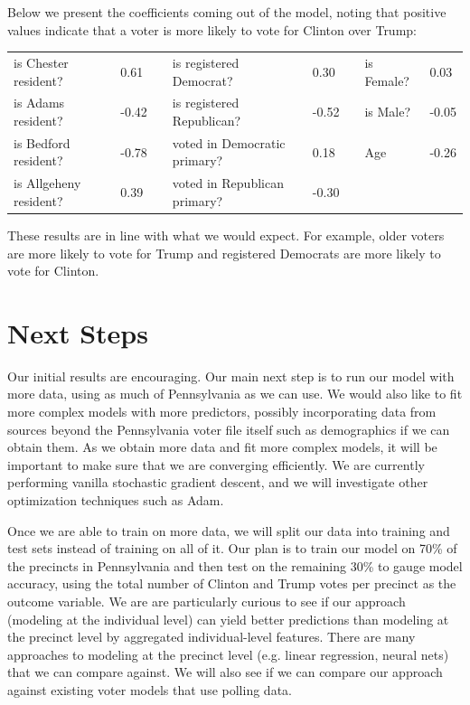 \documentclass[10pt, letterpaper]{article}
\begin{document}
Below we present the coefficients coming out of the model, noting that positive values indicate that a voter is more likely to vote for Clinton over Trump:

\begin{table}[H]
\centering
\begin{tabular}{|l|l|l|l|l|lll}
\cline{1-2} \cline{4-5} \cline{7-8}
is Chester resident?   & 0.61  &  & is registered Democrat?      & 0.30  & \multicolumn{1}{l|}{} & \multicolumn{1}{l|}{is Female?} & \multicolumn{1}{l|}{0.03}  \\ \cline{1-2} \cline{4-5} \cline{7-8} 
is Adams resident?     & -0.42 &  & is registered Republican?    & -0.52 & \multicolumn{1}{l|}{} & \multicolumn{1}{l|}{is Male?}   & \multicolumn{1}{l|}{-0.05} \\ \cline{1-2} \cline{4-5} \cline{7-8} 
is Bedford resident?   & -0.78 &  & voted in Democratic primary? & 0.18  & \multicolumn{1}{l|}{} & \multicolumn{1}{l|}{Age}        & \multicolumn{1}{l|}{-0.26} \\ \cline{1-2} \cline{4-5} \cline{7-8} 
is Allgeheny resident? & 0.39  &  & voted in Republican primary? & -0.30 &                       &                                 &                            \\ \cline{1-2} \cline{4-5}
\end{tabular}
\end{table}
These results are in line with what we would expect. For example, older voters are more likely to vote for Trump and registered Democrats are more likely to vote for Clinton.

\section{Next Steps}

Our initial results are encouraging. Our main next step is to run our model with more data, using as much of Pennsylvania as we can use. We would also like to fit more complex models with more predictors, possibly incorporating data from sources beyond the Pennsylvania voter file itself such as demographics if we can obtain them. As we obtain more data and fit more complex models, it will be important to make sure that we are converging efficiently. We are currently performing vanilla stochastic gradient descent, and we will investigate other optimization techniques such as Adam.

Once we are able to train on more data, we will split our data into training and test sets instead of training on all of it. Our plan is to train our model on 70\% of the precincts in Pennsylvania and then test on the remaining 30\% to gauge model accuracy, using the total number of Clinton and Trump votes per precinct as the outcome variable. We are are particularly curious to see if our approach (modeling at the individual level) can yield better predictions than modeling at the precinct level by aggregated individual-level features. There are many approaches to modeling at the precinct level (e.g. linear regression, neural nets) that we can compare against. We will also see if we can compare our approach against existing voter models that use polling data.
\end{document}
